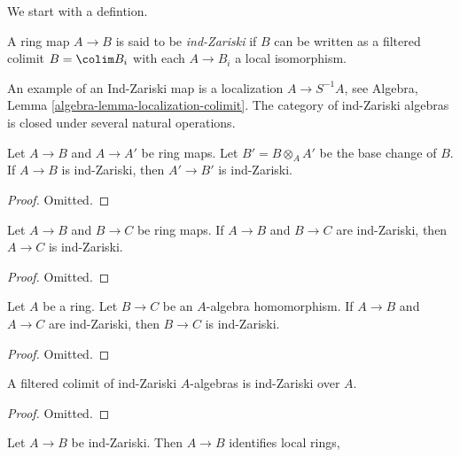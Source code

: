 \noindent
We start with a defintion.

\begin{definition}
\label{definition-ind-zariski}
A ring map $A \to B$ is said to be {\it ind-Zariski} if $B$ can be written
as a filtered colimit $B = \colim B_i$ with each $A \to B_i$ a local
isomorphism.
\end{definition}

\noindent
An example of an Ind-Zariski map is a localization $A \to S^{-1}A$, see
Algebra, Lemma \ref{algebra-lemma-localization-colimit}.
The category of ind-Zariski algebras is closed under several natural
operations.

\begin{lemma}
\label{lemma-base-change-ind-zariski}
Let $A \to B$ and $A \to A'$ be ring maps. Let $B' = B \otimes_A A'$
be the base change of $B$.
If $A \to B$ is ind-Zariski, then $A' \to B'$ is ind-Zariski.
\end{lemma}

\begin{proof}
Omitted.
\end{proof}

\begin{lemma}
\label{lemma-composition-ind-zariski}
Let $A \to B$ and $B \to C$ be ring maps. If $A \to B$ and $B \to C$
are ind-Zariski, then $A \to C$ is ind-Zariski.
\end{lemma}

\begin{proof}
Omitted.
\end{proof}

\begin{lemma}
\label{lemma-ind-zariski-permanence}
Let $A$ be a ring. Let $B \to C$ be an $A$-algebra homomorphism.
If $A \to B$ and $A \to C$ are ind-Zariski, then $B \to C$
is ind-Zariski.
\end{lemma}

\begin{proof}
Omitted.
\end{proof}

\begin{lemma}
\label{lemma-ind-ind-zariski}
A filtered colimit of ind-Zariski $A$-algebras is ind-Zariski over $A$.
\end{lemma}

\begin{proof}
Omitted.
\end{proof}

\begin{lemma}
\label{lemma-ind-zariski-implies}
Let $A \to B$ be ind-Zariski. Then $A \to B$ identifies local rings,
\end{lemma}

